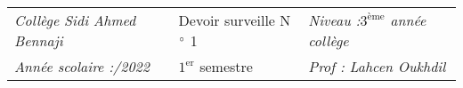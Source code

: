\documentclass[10pt,a4paper]{article}
\begin{document}
   \setlength{\arrayrulewidth}{1.5pt}
\vspace*{-2.1cm}
\begin{center}
\setlength{\arrayrulewidth}{0.4pt}
\renewcommand{\arraystretch}{1.7}
{\renewcommand{\tabularxcolumn}[1]{%
>{\centering \arraybackslash}m{#1}}
\begin{tabularx}{1.001\linewidth}{|X|X|X|}
\hline  \hline
\textit{\Timefont Collège Sidi Ahmed Bennaji} &{\mffont Devoir surveille N$\degree$ 1} &{ \Timefont \textit{Niveau :$3^{\text{ème}}$ année collège} }  \\
  \cline{3-3}     \cline{1-1}  
\textit{\Timefont Année scolaire :{\Samirfont 2021/2022 }}  & $1^{\text{er}}$ semestre & \textit{\Timefont Prof : Lahcen Oukhdil}    \\
\hline \hline 
\end{tabularx} }  
\\[2mm]
\end{center}
  \vspace*{-0.015\linewidth}  
\end{document}

